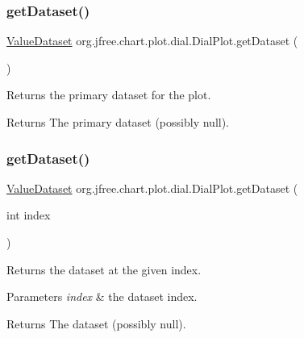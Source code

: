 \subsubsection{\texorpdfstring{get\+Dataset()}{getDataset()}\hspace{0.1cm}{\footnotesize\ttfamily [1/2]}}
{\footnotesize\ttfamily \mbox{\hyperlink{interfaceorg_1_1jfree_1_1data_1_1general_1_1_value_dataset}{Value\+Dataset}} org.\+jfree.\+chart.\+plot.\+dial.\+Dial\+Plot.\+get\+Dataset (\begin{DoxyParamCaption}{ }\end{DoxyParamCaption})}

Returns the primary dataset for the plot.

\begin{DoxyReturn}{Returns}
The primary dataset (possibly {\ttfamily null}). 
\end{DoxyReturn}
\mbox{\label{classorg_1_1jfree_1_1chart_1_1plot_1_1dial_1_1_dial_plot_a782887377943cbc9e72040ccd4ebd960}} 
\subsubsection{\texorpdfstring{get\+Dataset()}{getDataset()}\hspace{0.1cm}{\footnotesize\ttfamily [2/2]}}
{\footnotesize\ttfamily \mbox{\hyperlink{interfaceorg_1_1jfree_1_1data_1_1general_1_1_value_dataset}{Value\+Dataset}} org.\+jfree.\+chart.\+plot.\+dial.\+Dial\+Plot.\+get\+Dataset (\begin{DoxyParamCaption}\item[{int}]{index }\end{DoxyParamCaption})}

Returns the dataset at the given index.


\begin{DoxyParams}{Parameters}
{\em index} & the dataset index.\\
\hline
\end{DoxyParams}
\begin{DoxyReturn}{Returns}
The dataset (possibly {\ttfamily null}). 
\end{DoxyReturn}
\mbox{\label{classorg_1_1jfree_1_1chart_1_1plot_1_1dial_1_1_dial_plot_a32e8f87f59a9d5dc31a806a5dc39f5fc}} 
